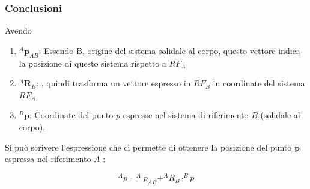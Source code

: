 ﻿\documentclass[11pt, a4paper]{article}
\begin{document}
\subsubsection{Conclusioni}
\noindent
\begin{minipage}{0.5\textwidth}
\end{minipage}
\hfill
\begin{minipage}{0.5\textwidth}
Avendo
\begin{enumerate}
    \item \( ^{A}\mathbf{p}_{AB} \): Essendo B, origine del sistema solidale al corpo, questo vettore indica la posizione di questo sistema rispetto a $RF_{A}$

    \item \( ^{A}\mathbf{R}_{B} \): , quindi trasforma un vettore espresso in $RF_{B}$ in coordinate del sistema $RF_{A}$

    \item \( ^{B}\mathbf{p} \): Coordinate del punto \( p \) espresse nel sistema di riferimento \( B \) (solidale al corpo).
\end{enumerate}

Si può scrivere l'espressione che ci permette di ottenere la posizione del punto \( \mathbf{p} \) espressa nel riferimento \( A \) :

\[
	^{A}p = ^{A}p_{AB} + ^{A}R_{B} \cdot ^{B}p
\]

\end{minipage}
\end{document}
